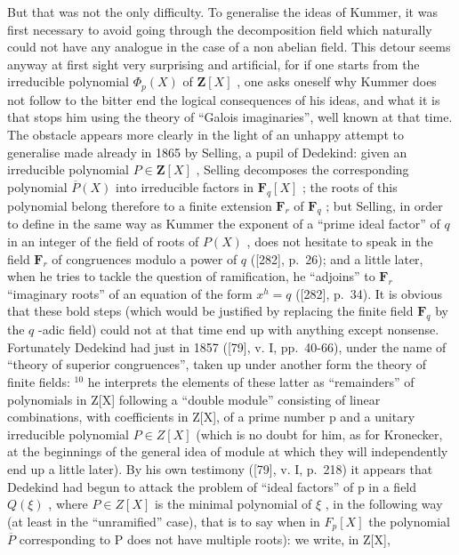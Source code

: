 But that was not the only difficulty. To generalise the ideas of Kummer, it was first necessary to avoid going through the decomposition field which naturally could not have any analogue in the case of a non abelian field. This detour seems anyway at first sight very surprising and artificial, for if one starts from the irreducible polynomial \(\Phi_p(X)\) of \(\mathbf{Z}[X]\) , one asks oneself why Kummer does not follow to the bitter end the logical consequences of his ideas, and what it is that stops him using the theory of ``Galois imaginaries'', well known at that time. The obstacle appears more clearly in the light of an unhappy attempt to generalise made already in 1865 by Selling, a pupil of Dedekind: given an irreducible polynomial \(P \in \mathbf{Z}[X]\) , Selling decomposes the corresponding polynomial \(\overline{P}(X)\) into irreducible factors in \(\mathbf{F}_q[X]\) ; the roots of this polynomial belong therefore to a finite extension \(\mathbf{F}_r\) of \(\mathbf{F}_q\) ; but Selling, in order to define in the same way as Kummer the exponent of a ``prime ideal factor'' of \(q\) in an integer of the field of roots of \(P(X)\) , does not hesitate to speak in the field \(\mathbf{F}_r\) of congruences modulo a power of \(q\) ({[}282{]}, p.~26); and a little later, when he tries to tackle the question of ramification, he ``adjoins'' to \(\mathbf{F}_r\) ``imaginary roots'' of an equation of the form \(x^h = q\) ({[}282{]}, p.~34). It is obvious that these bold steps (which would be justified by replacing the finite field \(\mathbf{F}_q\) by the \(q\) -adic field) could not at that time end up with anything except nonsense. Fortunately Dedekind had just in 1857 ({[}79{]}, v. I, pp.~40-66), under the name of ``theory of superior congruences'', taken up under another form the theory of finite fields: \(^{10}\) he interprets the elements of these latter as ``remainders'' of polynomials in Z{[}X{]} following a ``double module'' consisting of linear combinations, with coefficients in Z{[}X{]}, of a prime number p and a unitary irreducible polynomial \(P \in Z[X]\) (which is no doubt for him, as for Kronecker, at the beginnings of the general idea of module at which they will independently end up a little later). By his own testimony ({[}79{]}, v. I, p.~218) it appears that Dedekind had begun to attack the problem of ``ideal factors'' of p in a field \(Q(\xi)\) , where \(P \in Z[X]\) is the minimal polynomial of \(\xi\) , in the following way (at least in the ``unramified'' case), that is to say when in \(F_p[X]\) the polynomial \(\overline{P}\) corresponding to P does not have multiple roots): we write, in Z{[}X{]},

